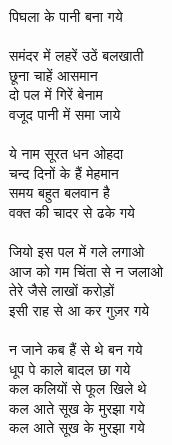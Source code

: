 {{{{{{{{{{{{{{{{{{{{{{{{{{{{{{{{{{{{{{{{{{{{{{{पिघला के पानी बना गये\\
\\
समंदर में लहरें उठें बलखाती\\
छूना चाहें आसमान\\
दो पल में गिरें बेनाम\\
वजूद पानी में समा जाये\\
\\
ये नाम सूरत धन ओहदा\\
चन्द दिनों के हैं मेहमान\\
समय बहुत बलवान है\\
वक्त की चादर से ढके गये\\
\\
जियो इस पल में गले लगाओ\\
आज को गम चिंता से न जलाओ\\
तेरे जैसे लाखों करोड़ों\\
इसी राह से आ कर गुज़र गये\\
\\
न जाने कब हैं से थे बन गये\\
धूप पे काले बादल छा गये\\
कल कलियों से फूल खिले थे\\
कल आते सूख के मुरझा गये\\
कल आते सूख के मुरझा गये\\
\\
\\
\\
}}}}}}}}}}}}}}}}}}}}}}}}}}}}}}}}}}}}}}}}}}}}}}}
